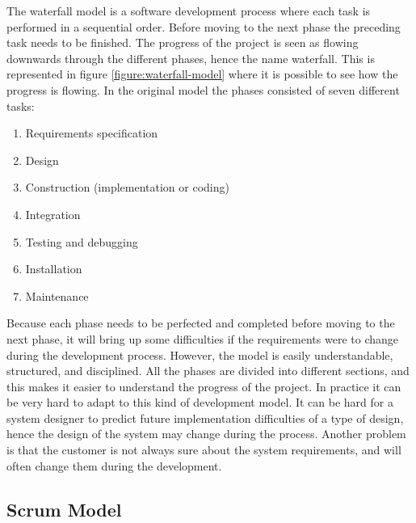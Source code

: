 The waterfall model is a software development process where each task is performed in a sequential order.
Before moving to the next phase the preceding task needs to be finished.
The progress of the project is seen as flowing downwards through the different phases, hence the name waterfall.
This is represented in figure \ref{figure:waterfall-model} where it is possible to see how the progress is flowing.
In the original model the phases consisted of seven different tasks:


\begin{enumerate}
\item Requirements specification
\item Design
\item Construction (implementation or coding)
\item Integration
\item Testing and debugging
\item Installation
\item Maintenance
\end{enumerate}

Because each phase needs to be perfected and completed before moving to the next phase, it will bring up some difficulties if the requirements were to change during the development process. 
However, the model is easily understandable, structured, and disciplined. 
All the phases are divided into different sections, and this makes it easier to understand the progress of the project.
In practice it can be very hard to adapt to this kind of development model. 
It can be hard for a system designer to predict future implementation difficulties of a type of design, hence the design of the system may change during the process.
Another problem is that the customer is not always sure about the system requirements, and will often change them during the development.

\subsection{Scrum Model} \nocite{Compendium}

